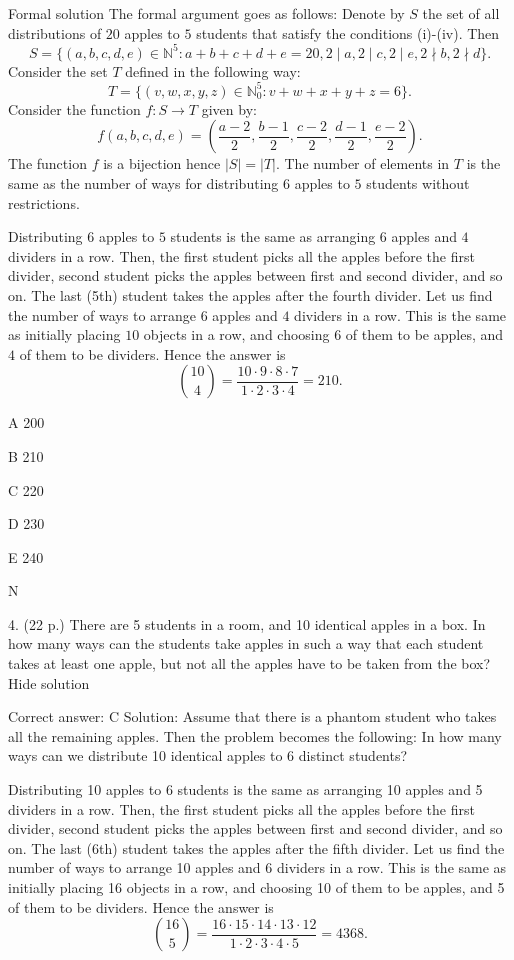 Formal solution The formal argument goes as follows: Denote by \( S \) the set of all distributions of \( 20 \) apples to \( 5 \) students that satisfy the conditions (i)-(iv). Then \[ S=\{(a,b,c,d,e)\in\mathbb N^5: a+b+c+d+e=20, 2\mid a, 2\mid c, 2\mid e, 2\nmid b, 2\nmid d\}.\] Consider the set \( T \) defined in the following way: \[ T=\{(v,w,x,y,z)\in\mathbb N_0^5: v+w+x+y+z=6\}.\] Consider the function \( f:S\to T \) given by: \[ f(a,b,c,d,e)=\left( \frac{a-2}2, \frac{b-1}2, \frac{c-2}2,\frac{d-1}2,\frac{e-2}2\right).\] The function \( f \) is a bijection hence \( |S|=|T| \). The number of elements in \( T \) is the same as the number of ways for distributing \( 6 \) apples to \( 5 \) students without restrictions.

Distributing \( 6 \) apples to \( 5 \) students is the same as arranging \( 6 \) apples and \( 4 \) dividers in a row. Then, the first student picks all the apples before the first divider, second student picks the apples between first and second divider, and so on. The last (5th) student takes the apples after the fourth divider. Let us find the number of ways to arrange \( 6 \) apples and \( 4 \) dividers in a row. This is the same as initially placing \( 10 \) objects in a row, and choosing \( 6 \) of them to be apples, and \( 4 \) of them to be dividers. Hence the answer is \[ \binom{10}{4}=\frac{10\cdot 9\cdot 8\cdot 7}{1\cdot 2\cdot 3\cdot 4}=210.\]

   A    200

   B    210

   C    220

   D    230

   E    240

   N
	

4.	(22 p.)
	There are 5 students in a room, and 10 identical apples in a box. In how many ways can the students take apples in such a way that each student takes at least one apple, but not all the apples have to be taken from the box?
Hide solution

Correct answer: C
Solution: Assume that there is a phantom student who takes all the remaining apples. Then the problem becomes the following:
In how many ways can we distribute 10 identical apples to 6 distinct students?

Distributing 10 apples to 6 students is the same as arranging 10 apples and 5 dividers in a row. Then, the first student picks all the apples before the first divider, second student picks the apples between first and second divider, and so on. The last (6th) student takes the apples after the fifth divider. Let us find the number of ways to arrange 10 apples and 6 dividers in a row. This is the same as initially placing 16 objects in a row, and choosing 10 of them to be apples, and 5 of them to be dividers. Hence the answer is \[ \binom{16}{5}=\frac{16\cdot 15\cdot 14\cdot 13\cdot 12}{1\cdot 2\cdot 3\cdot 4\cdot 5}=4368.\]

